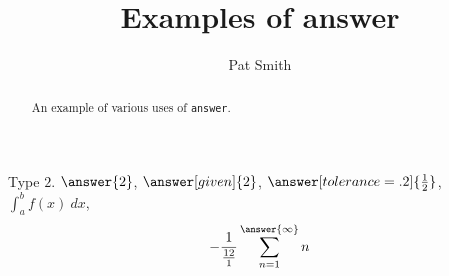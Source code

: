 \documentclass{ximera}
\title{Examples of answer}
\author{Pat Smith}
\begin{document}
\begin{abstract}
  An example of various uses of \texttt{answer}.
\end{abstract}
\maketitle

\begin{problem}
  Type $2$. $\answer{2}$, $\answer[given]{2}$, $\answer[tolerance=.2]{\frac{1}{2}}$,  $\int_a^b f(x) \ dx$,
  \[
  -\frac{1}{\frac{12}{1}}\sum_{n=1}^{\answer{\infty}} n
  \]
\end{problem}
\end{document}
